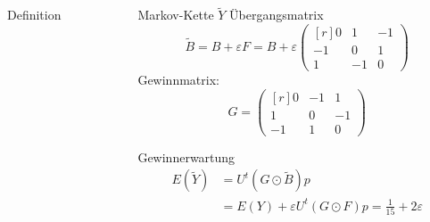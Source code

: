 \begin{frame}[t]
\begin{columns}[t,onlytextwidth]
\begin{column}{0.48\textwidth}
\begin{block}{Definition}
\begin{center}
\begin{tikzpicture}[>=latex,thick]
\end{tikzpicture}
\end{center}
\end{block}
\end{column}
\begin{column}{0.48\textwidth}
\begin{block}{Markov-Kette $\tilde{Y}$}
Übergangsmatrix
\[
\tilde{B}=
B+\varepsilon F
=
B+\varepsilon\begin{pmatrix*}[r]
0&1&-1\\
-1&0&1\\
1&-1&0
\end{pmatrix*}
\]
Gewinnmatrix:
\[
G=\begin{pmatrix*}[r]
0&-1&1\\
1&0&-1\\
-1&1&0
\end{pmatrix*}
\]
\end{block}
\begin{block}{Gewinnerwartung}
\begin{align*}
E(\tilde{Y})
&=
U^t(G\odot \tilde{B})p
\\
&=
E(Y) + \varepsilon U^t(G\odot F)p
=
\frac1{15}+2\varepsilon
\end{align*}
\end{block}
\end{column}
\end{columns}
\end{frame}
\egroup
